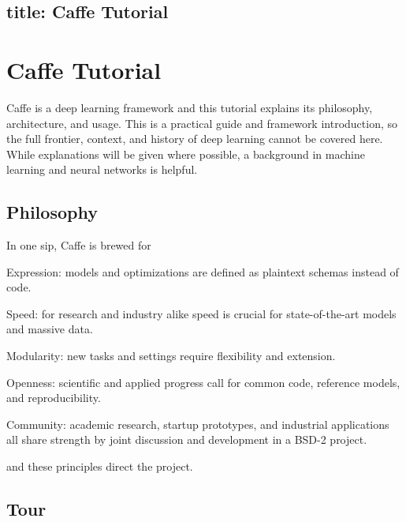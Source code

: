 

 \subsection*{title\+: Caffe Tutorial }

\section*{Caffe Tutorial}

Caffe is a deep learning framework and this tutorial explains its philosophy, architecture, and usage. This is a practical guide and framework introduction, so the full frontier, context, and history of deep learning cannot be covered here. While explanations will be given where possible, a background in machine learning and neural networks is helpful.

\subsection*{Philosophy}

In one sip, Caffe is brewed for


\begin{DoxyItemize}
\item Expression\+: models and optimizations are defined as plaintext schemas instead of code.
\item Speed\+: for research and industry alike speed is crucial for state-\/of-\/the-\/art models and massive data.
\item Modularity\+: new tasks and settings require flexibility and extension.
\item Openness\+: scientific and applied progress call for common code, reference models, and reproducibility.
\item Community\+: academic research, startup prototypes, and industrial applications all share strength by joint discussion and development in a B\+S\+D-\/2 project.
\end{DoxyItemize}

and these principles direct the project.

\subsection*{Tour}


